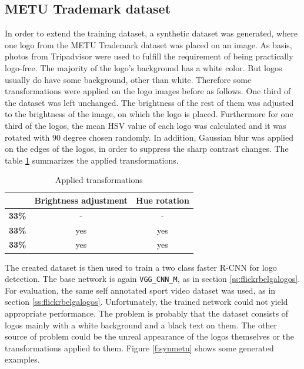 \subsection{METU Trademark dataset}\label{ss:metu}

In order to extend the training dataset, a synthetic dataset was generated, where one logo from the METU Trademark dataset \cite{DBLP:journals/corr/TursunAK17} was placed on an image. As basis, photos from Tripadvisor were used to fulfill the requirement of being practically logo-free. The majority of the logo's background has a white color. But logos usually do have some background, other than white. Therefore some transformations were applied on the logo images before as follows. One third of the dataset was left unchanged. The brightness of the rest of them was adjusted to the brightness of the image, on which the logo is placed. Furthermore for one third of the logos, the mean HSV value of each logo was calculated and it was rotated with 90 degree chosen randomly. In addition, Gaussian blur was applied on the edges of the logos, in order to suppress the sharp contrast changes. The table \ref{table:logotransformations} summarizes the applied transformations.

\begin{table}[ht!]
\centering
\begin{tabular}{|c|c|c|}
\hline & \textbf{Brightness adjustment} & \textbf{Hue rotation} \\
\hline
\textbf{33\%} & - & - \\
\hline
\textbf{33\%} & yes & yes \\
\hline
\textbf{33\%} & yes & yes \\ \hline
\end{tabular}
\caption{Applied transformations}
\label{table:logotransformations}
\end{table}

The created dataset is then used to train a two class faster R-CNN for logo detection. The base network is again \texttt{VGG\_CNN\_M}, as in section \ref{ss:flickrbelgalogos}. For evaluation, the same self annotated sport video dataset was used, as in section \ref{ss:flickrbelgalogos}. Unfortunately, the trained network could not yield appropriate performance. The problem is probably that the dataset consists of logos mainly with a white background and a black text on them. The other source of problem could be the unreal appearance of the logos themselves or the transformations applied to them. Figure \ref{f:synmetu} shows some generated examples.

